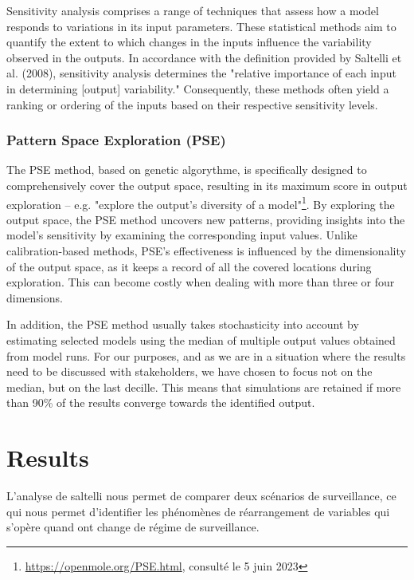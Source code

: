 \documentclass{article}
\begin{document}
    Sensitivity analysis comprises a range of techniques that assess how a model responds to variations in its input parameters. These statistical methods aim to quantify the extent to which changes in the inputs influence the variability observed in the outputs. In accordance with the definition provided by Saltelli et al. (2008)\cite{saltelli_global_2008}, sensitivity analysis determines the "relative importance of each input in determining [output] variability." Consequently, these methods often yield a ranking or ordering of the inputs based on their respective sensitivity levels.\\

    \subsubsection{Pattern Space Exploration (PSE)}
    The PSE \cite{cherel_beyond_2015}  method, based on genetic algorythme, is specifically designed to comprehensively cover the output space, resulting in its maximum score in output exploration -- e.g. "explore the output's diversity of a model"\footnote{\url{https://openmole.org/PSE.html}, consulté le 5 juin 2023}. By exploring the output space, the PSE method uncovers new patterns, providing insights into the model's sensitivity by examining the corresponding input values. Unlike calibration-based methods, PSE's effectiveness is influenced by the dimensionality of the output space, as it keeps a record of all the covered locations during exploration. This can become costly when dealing with more than three or four dimensions.

    In addition, the PSE method usually takes stochasticity into account by estimating selected models using the median of multiple output values obtained from model runs. For our purposes, and as we are in a situation where the results need to be discussed with stakeholders, we have chosen to focus not on the median, but on the last decille. This means that simulations are retained if more than 90\% of the results converge towards the identified output.

\section{Results}

L'analyse de saltelli nous permet de comparer deux scénarios de surveillance, ce qui nous permet d'identifier les phénomènes de réarrangement de variables qui s'opère quand ont change de régime de surveillance.\\
    
\end{document}
